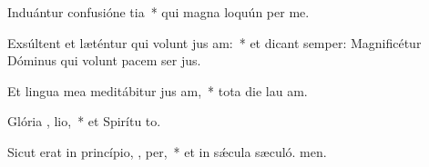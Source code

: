 \item Induántur confusióne  tia~* qui magna loquún per me.
\item Exsúltent et læténtur qui volunt jus am:~* et dicant semper: Magnificétur Dóminus qui volunt pacem ser jus.
\item Et lingua mea meditábitur jus am,~* tota die lau am.
\item Glória ,  lio,~* et Spirítu to.
\item Sicut erat in princípio,  ,  per,~* et in sǽcula sæculó. men.
